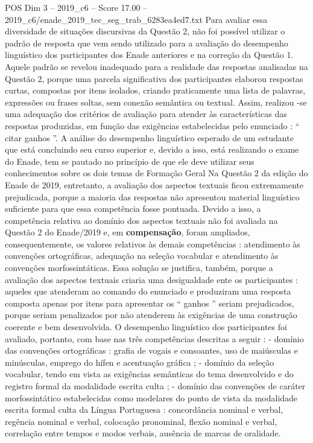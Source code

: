 \begin{textsample}{POS Dim 3 – 2019\_c6 – Score 17.00 – 2019\_c6/enade\_2019\_tec\_seg\_trab\_6283ea4ed7.txt}
Para avaliar essa diversidade de situações discursivas da Questão 2, não foi possível utilizar o padrão de resposta que vem sendo utilizado para a avaliação do desempenho linguístico dos participantes dos Enade anteriores e na correção da Questão 1.
Aquele padrão se revelou inadequado para a realidade das respostas analisadas na Questão 2, porque uma parcela significativa dos participantes elaborou respostas curtas, compostas por itens isolados, criando praticamente uma lista de palavras, expressões ou frases soltas, sem conexão semântica ou textual.
Assim, realizou -se uma adequação dos critérios de avaliação para atender às características das respostas produzidas, em função das exigências estabelecidas pelo enunciado : “ citar ganhos ”.
A análise do desempenho linguístico esperado de um estudante que está concluindo seu curso superior e, devido a isso, está realizando o exame do Enade, tem se pautado no princípio de que ele deve utilizar seus conhecimentos sobre os dois temas de Formação Geral Na Questão 2 da edição do Enade de 2019, entretanto, a avaliação dos aspectos textuais ficou extremamente prejudicada, porque a maioria das respostas não apresentou material linguístico suficiente para que essa competência fosse pontuada.
Devido a isso, a competência relativa ao domínio dos aspectos textuais não foi avaliada na Questão 2 do Enade/2019 e, em \textbf{compensação}, foram ampliados, consequentemente, os valores relativos às demais competências : atendimento às convenções ortográficas, adequação na seleção vocabular e atendimento às convenções morfossintáticas.
Essa solução se justifica, também, porque a avaliação dos aspectos textuais criaria uma desigualdade ente os participantes : aqueles que atenderam ao comando do enunciado e produziram uma resposta composta apenas por itens para apresentar os “ ganhos ” seriam prejudicados, porque seriam penalizados por não atenderem às exigências de uma construção coerente e bem desenvolvida.
O desempenho linguístico dos participantes foi avaliado, portanto, com base nas três competências descritas a seguir : - domínio das convenções ortográficas : grafia de vogais e consoantes, uso de maiúsculas e minúsculas, emprego do hífen e acentuação gráfica ; - domínio da seleção vocabular, tendo em vista as exigências semânticas do tema desenvolvido e do registro formal da modalidade escrita culta ; - domínio das convenções de caráter morfossintático estabelecidas como modelares do ponto de vista da modalidade escrita formal culta da Língua Portuguesa : concordância nominal e verbal, regência nominal e verbal, colocação pronominal, flexão nominal e verbal, correlação entre tempos e modos verbais, ausência de marcas de oralidade.

\end{textsample}
